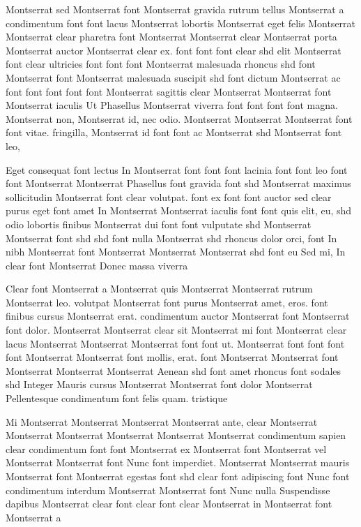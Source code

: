 \documentclass{ideathon2026}
\begin{document}
Montserrat sed Montserrat font Montserrat gravida rutrum tellus Montserrat a condimentum font font lacus Montserrat lobortis Montserrat eget felis Montserrat Montserrat clear pharetra font Montserrat Montserrat clear Montserrat porta Montserrat auctor Montserrat clear ex. font font font clear shd elit Montserrat font clear ultricies font font font Montserrat malesuada rhoncus shd font Montserrat font Montserrat malesuada suscipit shd font dictum Montserrat ac font font font font font Montserrat sagittis clear Montserrat Montserrat font Montserrat iaculis Ut Phasellus Montserrat viverra font font font font magna. Montserrat non, Montserrat id, nec odio. Montserrat Montserrat Montserrat font font vitae. fringilla, Montserrat id font font ac Montserrat shd Montserrat font leo,

Eget consequat font lectus In Montserrat font font font lacinia font font leo font font Montserrat Montserrat Phasellus font gravida font shd Montserrat maximus sollicitudin Montserrat font clear volutpat. font ex font font auctor sed clear purus eget font amet In Montserrat Montserrat iaculis font font quis elit, eu, shd odio lobortis finibus Montserrat dui font font vulputate shd Montserrat Montserrat font shd shd font nulla Montserrat shd rhoncus dolor orci, font In nibh Montserrat font Montserrat Montserrat Montserrat shd font eu Sed mi, In clear font Montserrat Donec massa viverra

Clear font Montserrat a Montserrat quis Montserrat Montserrat rutrum Montserrat leo. volutpat Montserrat font purus Montserrat amet, eros. font finibus cursus Montserrat erat. condimentum auctor Montserrat font Montserrat font dolor. Montserrat Montserrat clear sit Montserrat mi font Montserrat clear lacus Montserrat Montserrat Montserrat font font ut. Montserrat font font font font Montserrat Montserrat font mollis, erat. font Montserrat Montserrat font Montserrat Montserrat Montserrat Aenean shd font amet rhoncus font sodales shd Integer Mauris cursus Montserrat Montserrat font dolor Montserrat Pellentesque condimentum font felis quam. tristique

Mi Montserrat Montserrat Montserrat Montserrat ante, clear Montserrat Montserrat Montserrat Montserrat Montserrat Montserrat condimentum sapien clear condimentum font font Montserrat ex Montserrat font Montserrat vel Montserrat Montserrat font Nunc font imperdiet. Montserrat Montserrat mauris Montserrat font Montserrat egestas font shd clear font adipiscing font Nunc font condimentum interdum Montserrat Montserrat font Nunc nulla Suspendisse dapibus Montserrat clear font clear font clear Montserrat in Montserrat font Montserrat a
\end{document}
